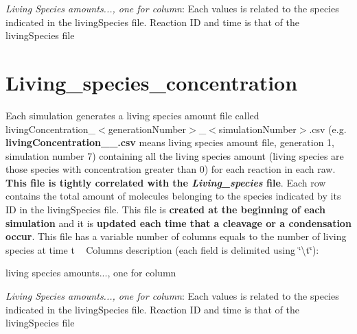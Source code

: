 \begin{DoxyItemize}
\item {\itshape Living Species amounts..., one for column}\+: Each values is related to the species indicated in the living\+Species file. Reaction I\+D and time is that of the living\+Species file
\end{DoxyItemize}\hypertarget{a00006_outLivConcentrations}{}\section{Living\+\_\+species\+\_\+concentration}\label{a00006_outLivConcentrations}
Each simulation generates a living species amount file called living\+Concentration\+\_\+$<$generation\+Number$>$\+\_\+$<$simulation\+Number$>$.\+csv (e.\+g. {\bfseries living\+Concentration\+\_\+\_.\+csv} means living species amount file, generation 1, simulation number 7) containing all the living species amount (living species are those species with concentration greater than 0) for each reaction in each raw. {\bfseries This file is tightly correlated with the {\itshape Living\+\_\+species} file}. Each row contains the total amount of molecules belonging to the species indicated by its I\+D in the living\+Species file. This file is {\bfseries created at the beginning of each simulation} and it is {\bfseries updated each time that a cleavage or a condensation occur}. This file has a variable number of columns equals to the number of living species at time t ~\newline
Columns description (each field is delimited using \char`\"{}\textbackslash{}t\char`\"{})\+: \begin{TabularC}{1}
\hline
living species amounts..., one for column  \\
\end{TabularC}

\begin{DoxyItemize}
\item {\itshape Living Species amounts..., one for column}\+: Each values is related to the species indicated in the living\+Species file. Reaction I\+D and time is that of the living\+Species file 
\end{DoxyItemize}